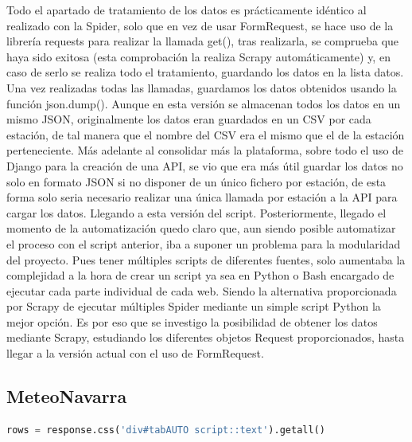 Todo el apartado de tratamiento de los datos es prácticamente idéntico al realizado con la Spider, solo que en vez de usar FormRequest, se hace uso de la librería requests para realizar la llamada get(), tras realizarla, se comprueba que haya sido exitosa (esta comprobación la realiza Scrapy automáticamente) y, en caso de serlo se realiza todo el tratamiento, guardando los datos en la lista datos. Una vez realizadas todas las llamadas, guardamos los datos obtenidos usando la función json.dump().\newline
\newline
Aunque en esta versión se almacenan todos los datos en un mismo JSON, originalmente los datos eran guardados en un CSV por cada estación, de tal manera que el nombre del CSV era el mismo que el de la estación perteneciente. Más adelante al consolidar más la plataforma, sobre todo el uso de Django para la creación de una API, se vio que era más útil guardar los datos no solo en formato JSON si no disponer de un único fichero por estación, de esta forma solo seria necesario realizar una única llamada por estación a la API para cargar los datos. Llegando a esta versión del script.\newline
\newline
Posteriormente, llegado el momento de la automatización quedo claro que, aun siendo posible automatizar el proceso con el script anterior, iba a suponer un problema para la modularidad del proyecto. Pues tener múltiples scripts de diferentes fuentes, solo aumentaba la complejidad a la hora de crear un script ya sea en Python o Bash encargado de ejecutar cada parte individual de cada web. Siendo la alternativa proporcionada por Scrapy de ejecutar múltiples Spider mediante un simple script Python la mejor opción.\newline
\newline
Es por eso que se investigo la posibilidad de obtener los datos mediante Scrapy, estudiando los diferentes objetos Request proporcionados, hasta llegar a la versión actual con el uso de FormRequest.

\subsection{MeteoNavarra}

\begin{lstlisting}[language=Python, caption={Selector en parse() de MeteoNavarra Code Spider}]
	rows = response.css('div#tabAUTO script::text').getall()
\end{lstlisting}


